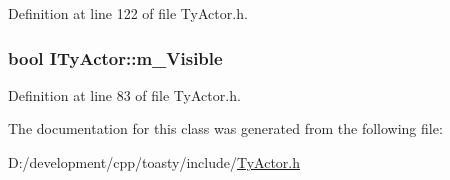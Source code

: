Definition at line 122 of file TyActor.h.

\hypertarget{class_i_ty_actor_a1019d46cd7502694e5f69c7c4c7be23e}{
\subsubsection[{m\_\-Visible}]{\setlength{\rightskip}{0pt plus 5cm}bool {\bf ITyActor::m\_\-Visible}}}
\label{class_i_ty_actor_a1019d46cd7502694e5f69c7c4c7be23e}


Definition at line 83 of file TyActor.h.



The documentation for this class was generated from the following file:\begin{DoxyCompactItemize}
\item 
D:/development/cpp/toasty/include/\hyperlink{_ty_actor_8h}{TyActor.h}\end{DoxyCompactItemize}
